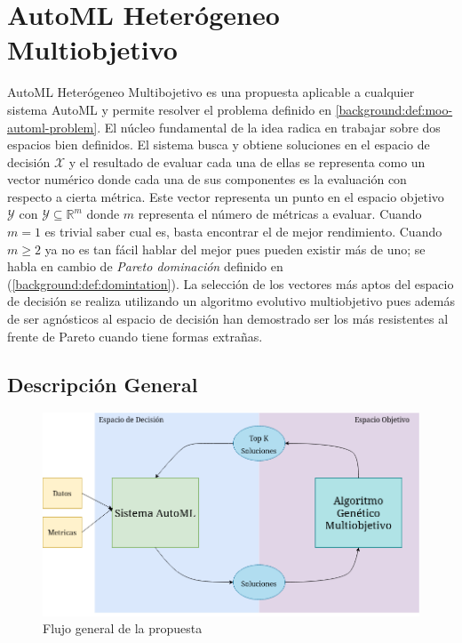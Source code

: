 
\chapter{AutoML Heter\'ogeneo Multiobjetivo}\label{chapter:proposal}

AutoML Heter\'ogeneo Multibojetivo es una propuesta aplicable a cualquier sistema AutoML y permite resolver el problema definido en \ref{background:def:moo-automl-problem}. El n\'ucleo fundamental de la idea radica en trabajar sobre dos espacios bien definidos. El sistema busca y obtiene soluciones en el espacio de decisi\'on $\mathcal{X}$ y el resultado  de evaluar cada una de ellas se representa como un vector num\'erico donde cada una de sus componentes es la evaluaci\'on con respecto a cierta m\'etrica. Este vector representa un punto en el espacio objetivo $\mathcal{Y}$ con $\mathcal{Y} \subseteq \mathbb{R}^m$ donde $m$ representa el n\'umero de m\'etricas a evaluar. Cuando $m = 1$ es trivial saber cual es, basta encontrar el de mejor rendimiento. Cuando $m \ge 2$ ya no es tan f\'acil hablar del mejor pues pueden existir m\'as de uno; se habla en cambio de \textit{Pareto dominaci\'on} definido en (\ref{background:def:domintation}). La selecci\'on de los vectores  m\'as aptos del espacio de decisi\'on se realiza utilizando un algoritmo evolutivo multiobjetivo pues adem\'as de ser agn\'osticos al espacio de decisi\'on han demostrado ser los m\'as resistentes al frente de Pareto cuando tiene formas extra\~nas.

\section{Descripci\'on General}
\begin{figure}[ht]
    \centering
    \includegraphics[scale=0.4]{Pictures/automl_moo_proposal2.png}
    \caption{Flujo general de la propuesta}
    \label{proposal:fig:flux}
\end{figure}

